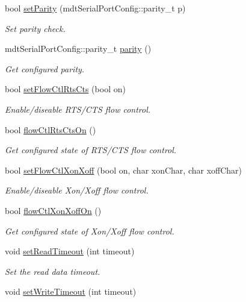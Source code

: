 \begin{DoxyCompactItemize}
bool \hyperlink{classmdt_serial_port_ae435f052a87dcd0b1829f1577bb5e58d}{setParity} (mdtSerialPortConfig::parity\_\-t p)
\begin{DoxyCompactList}\small\item\em Set parity check. \end{DoxyCompactList}\item 
mdtSerialPortConfig::parity\_\-t \hyperlink{classmdt_serial_port_a98938e2c51d1888236b920903f99050a}{parity} ()
\begin{DoxyCompactList}\small\item\em Get configured parity. \end{DoxyCompactList}\item 
bool \hyperlink{classmdt_serial_port_a175785be0dfe124254484822b7b8832e}{setFlowCtlRtsCts} (bool on)
\begin{DoxyCompactList}\small\item\em Enable/diseable RTS/CTS flow control. \end{DoxyCompactList}\item 
bool \hyperlink{classmdt_serial_port_a9315ed0c7854a09716a4585efb0094c7}{flowCtlRtsCtsOn} ()
\begin{DoxyCompactList}\small\item\em Get configured state of RTS/CTS flow control. \end{DoxyCompactList}\item 
bool \hyperlink{classmdt_serial_port_a34e2ac7b0d3cb7a6fb65756cbca2ce48}{setFlowCtlXonXoff} (bool on, char xonChar, char xoffChar)
\begin{DoxyCompactList}\small\item\em Enable/diseable Xon/Xoff flow control. \end{DoxyCompactList}\item 
bool \hyperlink{classmdt_serial_port_a8d3e3eb1d2272129b8b97377dff1d5d4}{flowCtlXonXoffOn} ()
\begin{DoxyCompactList}\small\item\em Get configured state of Xon/Xoff flow control. \end{DoxyCompactList}\item 
void \hyperlink{classmdt_serial_port_a9105e5a3a640b56097c1156000ace933}{setReadTimeout} (int timeout)
\begin{DoxyCompactList}\small\item\em Set the read data timeout. \end{DoxyCompactList}\item 
void \hyperlink{classmdt_serial_port_a036f49d743838013c9a8cbf6a1dd40d1}{setWriteTimeout} (int timeout)

\end{DoxyCompactItemize}
